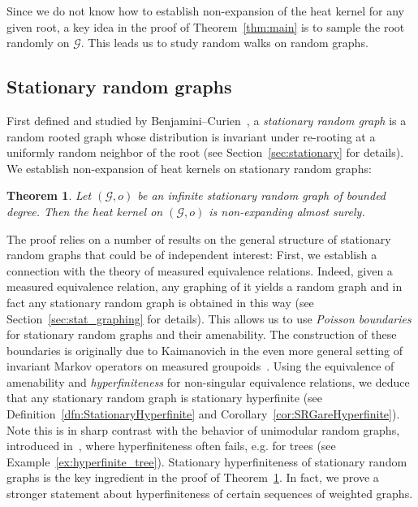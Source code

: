 \documentclass[10pt]{amsart}
\newtheorem{theo}{Theorem}[section]
\theoremstyle{definition}\newtheorem{defi}[theo]{Definition}\newtheorem{rema}[theo]{Remark}\newtheorem{exam}[theo]{Example}\newtheorem{exem}[theo]{Example}\newtheorem{nota}[theo]{Notation}
\newcommand{\calG}{\mathcal{G}}
\begin{document}
Since we do not know how to establish non-expansion of the heat kernel for any given root, a key idea in the proof of Theorem~\ref{thm:main} is to sample the root randomly on $\calG$. This leads us to study random walks on random graphs.

\subsection*{Stationary random graphs} \label{sec:stat_intro}

First defined and studied by Benjamini--Curien~\cite{BenCur}, a \emph{stationary random graph} is a random rooted graph whose distribution is invariant under re-rooting at a uniformly random neighbor of the root (see Section~\ref{sec:stationary} for details). We establish non-expansion of heat kernels on stationary random graphs:

\begin{theo}\label{thm:mainSt}
Let $(\calG,o)$ be an infinite stationary random graph of bounded degree. Then the heat kernel on $(\calG,o)$ is non-expanding almost surely.
\end{theo}

The proof relies on a number of results on the general structure of stationary random graphs that could be of independent interest: First, we establish a connection with the theory of measured equivalence relations. Indeed, given a measured equivalence relation, any graphing of it yields a random graph and in fact any stationary random graph is obtained in this way (see Section~\ref{sec:stat_graphing} for details). This allows us to use \emph{Poisson boundaries} for stationary random graphs and their amenability. The construction of these boundaries is originally due to Kaimanovich in the even more general setting of invariant Markov operators on measured groupoids~\cite{Kai05}. Using the equivalence of amenability and \emph{hyperfiniteness} for non-singular equivalence relations, we deduce that any stationary random graph is stationary hyperfinite (see Definition~\ref{dfn:StationaryHyperfinite} and Corollary~\ref{cor:SRGareHyperfinite}). Note this is in sharp contrast with the behavior of unimodular random graphs, introduced in~\cite{ALR2007}, where hyperfiniteness often fails, e.g. for trees (see Example~\ref{ex:hyperfinite_tree}). Stationary hyperfiniteness of stationary random graphs is the key ingredient in the proof of Theorem~\ref{thm:mainSt}. In fact, we prove a stronger statement about hyperfiniteness of certain sequences of weighted graphs.
\end{document}
